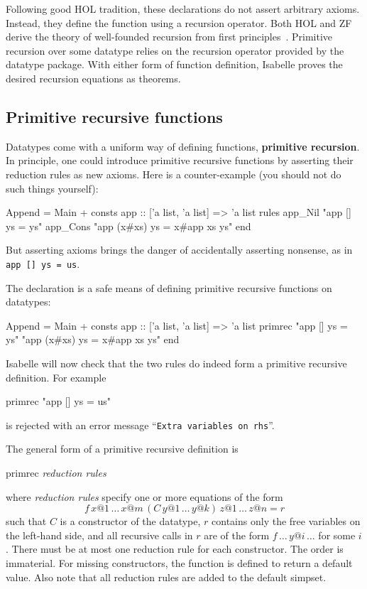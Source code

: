 Following good HOL tradition, these declarations do not assert arbitrary
axioms.  Instead, they define the function using a recursion operator.  Both
HOL and ZF derive the theory of well-founded recursion from first
principles~\cite{paulson-set-II}.  Primitive recursion over some datatype
relies on the recursion operator provided by the datatype package.  With
either form of function definition, Isabelle proves the desired recursion
equations as theorems.


\subsection{Primitive recursive functions}
\label{sec:HOL:primrec}

Datatypes come with a uniform way of defining functions, {\bf primitive
  recursion}.  In principle, one could introduce primitive recursive functions
by asserting their reduction rules as new axioms.  Here is a counter-example
(you should not do such things yourself):
\begin{ttbox}
Append = Main +
consts app :: ['a list, 'a list] => 'a list
rules 
   app_Nil   "app [] ys = ys"
   app_Cons  "app (x#xs) ys = x#app xs ys"
end
\end{ttbox}
But asserting axioms brings the danger of accidentally asserting nonsense, as
in \verb$app [] ys = us$.

The  declaration is a safe means of defining primitive
recursive functions on datatypes:
\begin{ttbox}
Append = Main +
consts app :: ['a list, 'a list] => 'a list
primrec
   "app [] ys = ys"
   "app (x#xs) ys = x#app xs ys"
end
\end{ttbox}
Isabelle will now check that the two rules do indeed form a primitive
recursive definition.  For example
\begin{ttbox}
primrec
    "app [] ys = us"
\end{ttbox}
is rejected with an error message ``\texttt{Extra variables on rhs}''.

\bigskip

The general form of a primitive recursive definition is
\begin{ttbox}
primrec
    {\it reduction rules}
\end{ttbox}
where \textit{reduction rules} specify one or more equations of the form
\[ f \, x@1 \, \dots \, x@m \, (C \, y@1 \, \dots \, y@k) \, z@1 \,
\dots \, z@n = r \] such that $C$ is a constructor of the datatype, $r$
contains only the free variables on the left-hand side, and all recursive
calls in $r$ are of the form $f \, \dots \, y@i \, \dots$ for some $i$.  There
must be at most one reduction rule for each constructor.  The order is
immaterial.  For missing constructors, the function is defined to return a
default value.  Also note that all reduction rules are added to the default
simpset.
  
